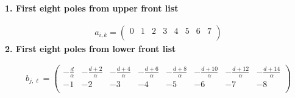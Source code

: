 \documentclass[11pt]{article}
\begin{document}
\noindent\textbf{1. First eight poles from upper front list}

\begin{align*}
  a_{i,k} = 
  \left(
\begin{array}{cccccccc}
 0 & 1 & 2 & 3 & 4 & 5 & 6 & 7 \\
\end{array}
\right)
\end{align*}
\noindent\textbf{2. First eight poles from lower front list}

\begin{align*}
  b_{j,\ell} = 
  \left(
\begin{array}{cccccccc}
 -\frac{d}{\alpha } & -\frac{d+2}{\alpha } & -\frac{d+4}{\alpha } & -\frac{d+6}{\alpha } & -\frac{d+8}{\alpha } & -\frac{d+10}{\alpha } & -\frac{d+12}{\alpha } & -\frac{d+14}{\alpha } \\
 -1 & -2 & -3 & -4 & -5 & -6 & -7 & -8 \\
\end{array}
\right)
\end{align*}

\printbibliography[title={References}]
\end{document}
